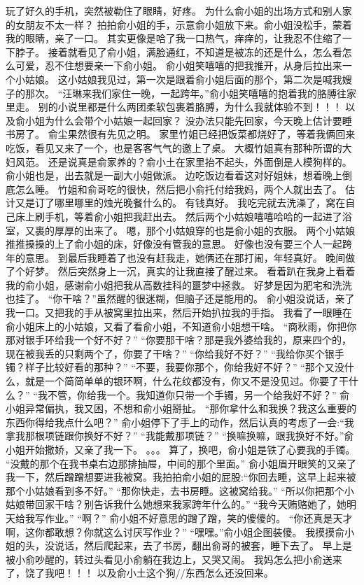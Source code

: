 玩了好久的手机，突然被勒住了眼睛，好疼。
为什么俞小姐的出场方式和别人家的女朋友不太一样？
拍拍俞小姐的手，示意俞小姐放下来。俞小姐没松手，蒙着我的眼睛，亲了一口。
其实更像是哈了我一口热气，痒痒的，让我忍不住缩了一下脖子。
接着就看见了俞小姐，满脸通红，不知道是被冻的还是什么，怎么看怎么可爱，忍不住想要亲一下俞小姐。
俞小姐笑嘻嘻的把我推开，从身后拉出来一个小姑娘。
这小姑娘我见过，第一次是跟着俞小姐后面的那个，第二次是喊我嫂子的那次。
“汪琳来我们家住一晚，一起跨年。”俞小姐笑嘻嘻的抱着我的胳膊往家里走。
别的小说里都是什么两团柔软包裹着胳膊，为什么我就体验不到！！！
以及俞小姐为什么会带个小姑娘一起回家？
没办法只能先回家，今天晚上估计要睡书房了。
俞尘果然很有先见之明。
家里竹姐已经把饭菜都烧好了，等着我俩回来吃饭，看见又来了一个，也是客客气气的邀上了桌。
大概竹姐真有那种所谓的大妇风范。
还是说真是俞家养的？俞小土在家里抬不起头，外面倒是人模狗样的。俞小姐也是，出去就是一副大小姐做派。
边吃饭边看着这对好姐妹，想着晚上倒底怎么睡。
竹姐和俞哥吃的很快，然后把小俞托付给我妈，两个人就出去了。
估计又是订了哪里哪里的烛光晚餐什么的。
有钱真好。
我吃完就去洗澡了，窝在自己床上刷手机，等着俞小姐把我赶出去。
然后两个小姑娘嘻嘻哈哈的一起进了浴室，又裹的厚厚的出来了。
嗯，那个小姑娘穿的也是俞小姐的衣服。
两个小姑娘推推搡搡的上了俞小姐的床，好像没有管我的意思。
好像也没有要三个人一起跨年的意思。
到最后我睡着了也没有赶我走，她俩还在那打闹，年轻真好。
晚间做了个好梦。
然后突然身上一沉，真实的让我直接了醒过来。
看着趴在我身上看着我的俞小姐，感谢俞小姐把我从高数挂科的噩梦中拯救。
好梦是因为肥宅和洗洗也挂了。
“你干啥？”虽然醒的很迷糊，但脑子还是能用的。
俞小姐没说话，亲了我一口。又把我的手从被窝里拉出来，然后开始扒拉我的手指。
我看了一眼睡在俞小姐床上的小姑娘，又看了看俞小姐，不知道俞小姐想干啥。
“商秋雨，你把你那对银手环给我一个好不好？”
“你要那干啥？那是我外婆给我的，原来四个的，现在被我丢的只剩两个了，你要了干啥？”
“你给我好不好？”
“我给你买个银手镯？样子比较好看的那种？”
“不要，我要你那个，你给我好不好？”
“那个又没什么，就是一个简简单单的银环啊，什么花纹都没有，你又不是没见过。你要了干什么？”
“我不管，你给我一个。我知道你只带一个手镯，另一个给我好不好？”
俞小姐异常偏执，我又困，不想和俞小姐掰扯。
“那你拿什么和我换？我这么重要的东西你得给我点什么吧？”
俞小姐停下了手上的动作，然后认真的考虑了一会:“我拿我那根项链跟你换好不好？”
“我能戴那项链？”
“换嘛换嘛，跟我换好不好。”俞小姐开始撒娇，又亲了我一下。
。。。
算了，换吧，俞小姐是铁了心要我的手镯。
“没戴的那个在我书桌右边那排抽屉，中间的那个里面。”
俞小姐眉开眼笑的又亲了我一下，然后蹭蹭想要进我被窝。我拍拍俞小姐的屁股:“你回去睡，这早上起来被那个小姑娘看到多不好。”
“那你快走，去书房睡。这被窝给我。”
“所以你把那个小姑娘带回家干啥？别告诉我什么她想来我家跨年什么的。”
“我今天贿赂她了，她明天给我写作业。”
“啊？”
俞小姐不好意思的蹭了蹭，笑的傻傻的。
“你还真是天才啊，这你都敢想？你就这么讨厌写作业？”
“嘿嘿。”俞小姐企图装傻。
我摸摸俞小姐的头，没说话，然后爬起来，去了书房，翻出俞哥的被套，睡下去了。
早上是被小俞吵醒的，转过头看见小俞躺在我边上，又哭又闹。
我妈怎么把小俞送来了，饶了我吧！！！
以及俞小土这个狗//东西怎么还没回来。

